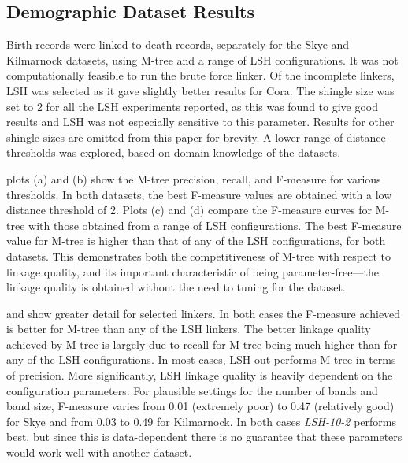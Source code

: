 \documentclass{llncs}
\begin{document}

\subsection{Demographic Dataset Results}

Birth records were linked to death records, separately for the Skye and
Kilmarnock datasets, using M-tree and a range of LSH configurations. It
was not computationally feasible to run the brute force linker. Of the
incomplete linkers, LSH was selected as it gave slightly better results
for Cora. The shingle size was set to 2 for all the LSH experiments
reported, as this was found to give good results and LSH was not
especially sensitive to this parameter. Results for other shingle sizes
are omitted from this paper for brevity. A lower range of distance
thresholds was explored, based on domain knowledge of the datasets.

 plots (a) and (b) show the M-tree precision,
recall, and F-measure for various thresholds. In both datasets, the best
F-measure values are obtained with a low distance threshold of 2. Plots
(c) and (d) compare the F-measure curves for M-tree with those obtained
from a range of LSH configurations. The best F-measure value for M-tree
is higher than that of any of the LSH configurations, for both datasets.
This demonstrates both the competitiveness of M-tree with respect to
linkage quality, and its important characteristic of being
parameter-free---the linkage quality is obtained without the need to
tuning for the dataset.

 and
 show greater detail for
selected linkers. In both cases the F-measure achieved is better for
M-tree than any of the LSH linkers. The better linkage quality achieved
by M-tree is largely due to recall for M-tree being much higher than for
any of the LSH configurations. In most cases, LSH out-performs M-tree in
terms of precision. More significantly, LSH linkage quality is heavily
dependent on the configuration parameters. For plausible settings for
the number of bands and band size, F-measure varies from 0.01 (extremely
poor) to 0.47 (relatively good) for Skye and from 0.03 to 0.49 for
Kilmarnock. In both cases \emph{LSH-10-2} performs best, but since this
is data-dependent there is no guarantee that these parameters would work
well with another dataset.
\end{document}
